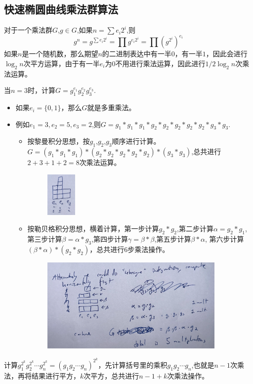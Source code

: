 \documentclass[10pt]{ctexart}
\begin{document}
\subsection{快速椭圆曲线乘法群算法}
对于一个乘法群$G$,$g \in G$,如果$n = \sum e_i 2^i$,则
\begin{displaymath}
    g^n = g^{\sum e_i 2^i} = \prod g^{e_i 2^i}= \prod (g^{2^i})^{e_i}
\end{displaymath}
如果$n$是一个随机数，那么期望$n$的二进制表达中有一半$0$，有一半$1$，因此会进行$\log_2 n$次平方运算，由于有一半$e_i$为$0$不用进行乘法运算，因此进行$1/2 \log_2 n$次乘法运算。


当$n=3$时，计算$G = g_1^{e_1}g_2^{e_2}g_3^{e_3}$.
\begin{itemize}
    \item 如果$e_i = \{0,1\}$，那么$G$就是多重乘法。
    \item 例如$e_1 = 3,e_2 = 5,e_3 = 2$,则$G = g_1 *g_1*g_1*g_2*g_2*g_2*g_2*g_2*g_3*g_3$.
    \begin{itemize}
        \item 按黎曼积分思想，按$g_1$,$g_2$,$g_3$顺序进行计算。$G = (g_1 *g_1*g_1)*(g_2*g_2*g_2*g_2*g_2)*(g_3*g_3)$,总共进行$2+3+1+2=8$次乘法运算。
        \begin{figure}[H]
            \centering
            \includegraphics[width=0.15\textwidth]{./img/multi-1.png} 
        \end{figure}
        \item 按勒贝格积分思想，横着计算，第一步计算$g_2*g_2$,第二步计算$\alpha = g_2*g_1$,第三步计算$\beta = \alpha * g_3$,第四步计算$\gamma = \beta * \beta$,第五步计算$\beta * \alpha$, 第六步计算$(\beta * \alpha) * (g_2*g_2)$，总共进行6步乘法操作。
        \begin{figure}[H]
            \centering
            \includegraphics[width=0.9\textwidth]{./img/multi-2.png} 
        \end{figure}
    \end{itemize} 
\end{itemize}
计算$g_1^{2^k}g_2^{2^k} \cdots g_n^{2^k}=(g_1g_2 \cdots g_n)^{2^k}$，先计算括号里的乘积$g_1g_2 \cdots g_n$,也就是$n-1$次乘法，再将结果进行平方，$k$次平方，总共进行$n - 1 + k$次乘法操作。
\end{document}
